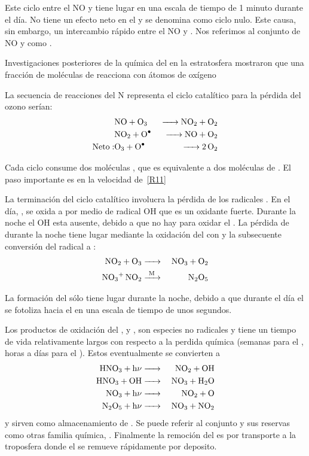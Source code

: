 Este ciclo entre el NO y  tiene lugar en una escala de tiempo de 1 minuto durante el día. No tiene un efecto neto en el  y se denomina como ciclo nulo. Este causa, sin embargo, un intercambio rápido entre el NO y . Nos referimos al conjunto de NO y  como .

Investigaciones posteriores de la química del  en la estratosfera mostraron que una fracción de moléculas de  reacciona con átomos de oxígeno 


La secuencia de reacciones del N representa el ciclo catalítico para la pérdida del ozono  serían:
\begin{eqnarray}
            & \ce{NO + O3     &->   NO2 + O2} \label{R10} \\
            &\ce{NO2 +  O^.   & ->   NO + O2 } \label{R11} \\
  \mathrm{Neto: } &\ce{O3 + O^.  &->  2O2}\nonumber 
\end{eqnarray}

Cada ciclo consume dos moléculas  , que es equivalente a dos moléculas de . El paso importante es en la velocidad de~\ref{R11}

La terminación del ciclo catalítico involucra la pérdida de los radicales . En el día,  , se oxida a   por medio de radical OH que es un oxidante fuerte.
Durante la noche el OH esta ausente, debido a que no hay  para oxidar el . La pérdida de   durante la noche tiene lugar mediante la oxidación del  con  y la subsecuente conversión del radical  a :
\begin{eqnarray*}
 \ce{NO2 + O3    & ->       & NO3 + O2 \\
       NO3+ NO2  &  ->[M] & N2O5}
\end{eqnarray*}

La formación del  sólo tiene lugar durante la noche, debido a que durante el día el  se fotoliza hacia el  en una escala de tiempo de unos segundos.

Los productos de oxidación del ,  y , son especies no radicales y tiene un tiempo de vida relativamente largos con respecto a la perdida química (semanas para el , horas a días para el ). Estos eventualmente se convierten a 
\begin{eqnarray*}
 \ce{HNO3 + h$\nu$   & ->   & NO2 + OH \\
       HNO3 + OH        &  ->  & NO3 + H2O\\
       NO3  + h$\nu$    & ->   & NO2 + O\\
       N2O5 + h$\nu$   & ->   & NO3 + NO2}
\end{eqnarray*}
y sirven como almacenamiento de . Se puede referir al conjunto  y sus reservas como otras familia química, . Finalmente la remoción del  es por transporte a la troposfera donde el  se remueve rápidamente por deposito.


